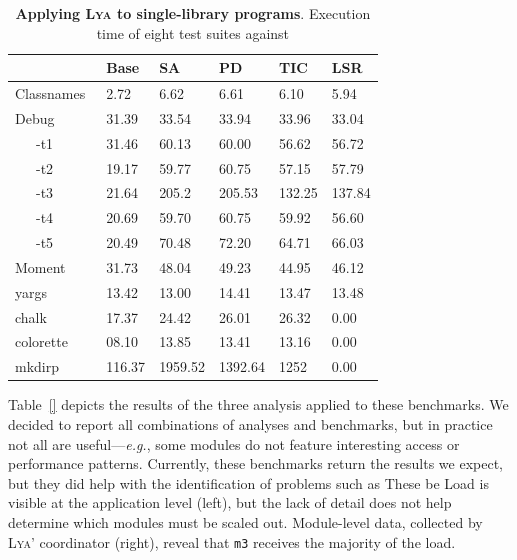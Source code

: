 \documentclass[letterpaper,twocolumn,10pt]{article}
\def\eg{{\em e.g.}, }
\newcommand{\ttt}[1]{\texttt{#1}}
\newcommand{\sys}{{\scshape Lya}\xspace}
\newcommand{\fixme}[1]{{\color{red}#1}}
\begin{document}
\begin{table}[t]
\center
\footnotesize
\setlength\tabcolsep{3pt}
\caption{
  \footnotesize{
    \textbf{Applying \sys to single-library programs}.
		\fixme{Execution time of eight test suites against }
  }
}
\begin{tabular*}{\columnwidth}{l @{\extracolsep{\fill}} ll lll}
\toprule
                    & Base   &  SA   & PD     &   TIC   & LSR     \\
\midrule
Classnames~\cite{}  &  2.72  & 6.62  &  6.61  &  6.10   & 5.94    \\
Debug~\cite{}       & 31.39  & 33.54 &  33.94 &  33.96  & 33.04   \\
~~~-t1              & 31.46  & 60.13 &  60.00 &  56.62  & 56.72   \\
~~~-t2              & 19.17  & 59.77 &  60.75 &  57.15  & 57.79   \\
~~~-t3              & 21.64  & 205.2 &  205.53&  132.25 & 137.84  \\
~~~-t4              & 20.69  & 59.70 &  60.75 &  59.92  & 56.60   \\
~~~-t5              & 20.49  & 70.48 &  72.20 &  64.71  & 66.03   \\
Moment~\cite{}      & 31.73  & 48.04 &  49.23 &  44.95  & 46.12   \\
yargs~\cite{}       & 13.42  & 13.00 &  14.41 &  13.47  & 13.48   \\
chalk~\cite{} 	    & 17.37  & 24.42 &  26.01 &  26.32  & 0.00    \\
colorette~\cite{}   & 08.10  & 13.85 &  13.41 &  13.16  & 0.00    \\
mkdirp~\cite{}      & 116.37 & 1959.52 & 1392.64 & 1252 & 0.00    \\
\bottomrule
\end{tabular*}
\label{tab:meso}
\vspace{-5mm}
\end{table}


Table~\ref{} depicts the results of the three analysis applied to these benchmarks.
We decided to report all combinations of analyses and benchmarks, but in practice not all are useful---\eg some modules do not feature interesting access or performance patterns.
Currently, these benchmarks return the results we expect, but they did help with the identification of problems such as 
These be
Load is visible at the application level (left), but the lack of detail does not help determine which modules must be scaled out.
Module-level data, collected by \sys' coordinator (right), reveal that \ttt{m3} receives the majority of the load.
\end{document}
